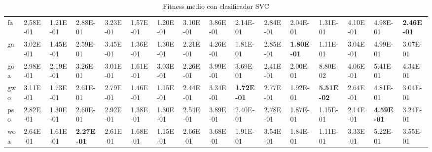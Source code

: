 \begin{table}
\begin{adjustbox}{width=\linewidth}
\begin{tabular}{llllllllllllllll}
            fa        & 2.58E-01          & 1.21E-01          & 2.88E-01          & 3.23E-01          & 1.57E-01          & 1.20E-01          & 3.10E-01          & 3.86E-01          & 2.14E-01          & 2.84E-01          & 2.04E-01          & 1.31E-01          & 4.10E-01          & 4.98E-01          & \textbf{2.46E-01}\tabularnewline
            ga        & 3.02E-01          & 1.45E-01          & 2.59E-01          & 3.45E-01          & 1.36E-01          & 1.30E-01          & 2.21E-01          & 4.26E-01          & 1.81E-01          & 2.85E-01          & \textbf{1.80E-01} & 1.11E-01          & 3.04E-01          & 4.99E-01          & 3.07E-01\tabularnewline
            goa       & 2.98E-01          & 2.19E-01          & 3.26E-01          & 3.01E-01          & 1.61E-01          & 3.03E-01          & 2.26E-01          & 3.99E-01          & 3.69E-01          & 2.41E-01          & 2.00E-01          & 8.80E-02          & 4.06E-01          & 5.41E-01          & 4.34E-01\tabularnewline
            gwo       & 3.11E-01          & 1.73E-01          & 2.61E-01          & 2.79E-01          & 1.46E-01          & 1.15E-01          & 2.44E-01          & 3.34E-01          & \textbf{1.72E-01} & 2.77E-01          & 1.92E-01          & \textbf{5.51E-02} & 2.64E-01          & 4.81E-01          & 3.04E-01\tabularnewline
            pso       & 2.82E-01          & 1.30E-01          & 2.60E-01          & 2.92E-01          & 1.38E-01          & 1.30E-01          & 2.54E-01          & 3.89E-01          & 2.40E-01          & 2.78E-01          & 1.87E-01          & 1.15E-01          & 2.14E-01          & \textbf{4.59E-01} & 3.24E-01\tabularnewline
            woa       & 2.64E-01          & 1.61E-01          & \textbf{2.27E-01} & 2.61E-01          & 1.68E-01          & 1.15E-01          & 2.66E-01          & 3.68E-01          & 1.91E-01          & 3.54E-01          & 1.84E-01          & 1.11E-01          & 3.33E-01          & 5.22E-01          & 3.55E-01\tabularnewline
            \bottomrule
        \end{tabular}
    \end{adjustbox}
    \caption{Fitness medio con clasificador SVC}
    \label{tab:fitness_svc}
\end{table}

